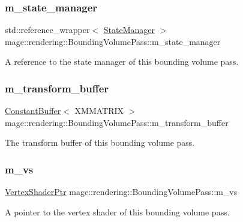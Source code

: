 \subsubsection{\texorpdfstring{m\+\_\+state\+\_\+manager}{m\_state\_manager}}
{\footnotesize\ttfamily std\+::reference\+\_\+wrapper$<$ \mbox{\hyperlink{classmage_1_1rendering_1_1_state_manager}{State\+Manager}} $>$ mage\+::rendering\+::\+Bounding\+Volume\+Pass\+::m\+\_\+state\+\_\+manager\hspace{0.3cm}{\ttfamily [private]}}

A reference to the state manager of this bounding volume pass. \mbox{\label{classmage_1_1rendering_1_1_bounding_volume_pass_a814cde2a674f4c6e4052e5af740253b3}} 
\subsubsection{\texorpdfstring{m\+\_\+transform\+\_\+buffer}{m\_transform\_buffer}}
{\footnotesize\ttfamily \mbox{\hyperlink{classmage_1_1rendering_1_1_constant_buffer}{Constant\+Buffer}}$<$ X\+M\+M\+A\+T\+R\+IX $>$ mage\+::rendering\+::\+Bounding\+Volume\+Pass\+::m\+\_\+transform\+\_\+buffer\hspace{0.3cm}{\ttfamily [private]}}

The transform buffer of this bounding volume pass. \mbox{\label{classmage_1_1rendering_1_1_bounding_volume_pass_aed191e277603f097bcd55501339fd279}} 
\subsubsection{\texorpdfstring{m\+\_\+vs}{m\_vs}}
{\footnotesize\ttfamily \mbox{\hyperlink{namespacemage_1_1rendering_aaf704b9c54a4181f4950a1761de69dda}{Vertex\+Shader\+Ptr}} mage\+::rendering\+::\+Bounding\+Volume\+Pass\+::m\+\_\+vs\hspace{0.3cm}{\ttfamily [private]}}

A pointer to the vertex shader of this bounding volume pass. 